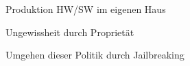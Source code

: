 \begin{frame}

	\begin{block}{}
		Produktion HW/SW im eigenen Haus
	\end{block}
	\begin{block}{}
		Ungewissheit durch Proprietät
	\end{block}
	\begin{block}{}
		Umgehen dieser Politik durch Jailbreaking
	\end{block}

\end{frame}